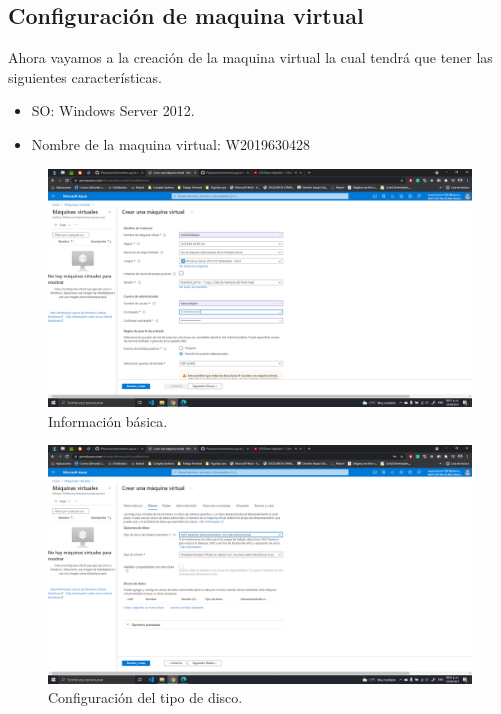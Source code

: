 \documentclass[11pt]{article}
\begin{document}
\subsection{Configuración de maquina virtual}
Ahora vayamos a la creación de la maquina virtual la cual tendrá que tener las siguientes características.
		\begin{itemize}
			\item SO: Windows Server 2012.
			\item Nombre de la maquina virtual: W2019630428    
		\end{itemize}
		\begin{figure}[H]
			\centering
			\includegraphics[scale=0.34]{resources/datosbasicos.png}
			\caption{Información básica. }\label{fig:picture}
		\end{figure}
		\begin{figure}[H]
			\centering
			\includegraphics[scale=0.34]{resources/datosdisco.png}
			\caption{Configuración del tipo de disco. }\label{fig:picture}
		\end{figure}
\end{document}
